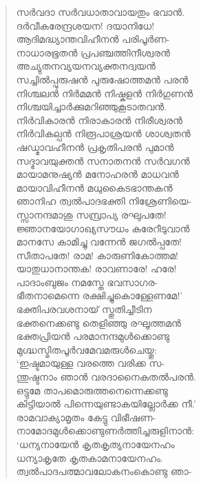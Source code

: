 \begin{verse}
സര്‍വദാ സര്‍വധാതാവായതും ഭവാന്‍.\\
ദര്‍വീകരേന്ദ്രശയന! ദയാനിധേ!\\
ആദിമദ്ധ്യാന്തവിഹീനന്‍ പരിപൂര്‍ണ-\\
നാധാരഭൂതന്‍ പ്രപഞ്ചത്തിനീശ്വരന്‍\\
അച്യുതനവ്യയനവ്യക്തനദ്വയന്‍\\
സച്ചില്‍പ്പുരുഷന്‍ പുരുഷോത്തമന്‍ പരന്‍\\
നിശ്ചലന്‍ നിര്‍മമന്‍ നിഷ്കളന്‍ നിര്‍ഗുണന്‍\\
നിശ്ചയിച്ചാര്‍ക്കുമറിഞ്ഞുകൂടാതവന്‍.\\
നിര്‍വികാരന്‍ നിരാകാരന്‍ നിരീശ്വരന്‍\\
നിര്‍വികല്പന്‍ നിരൂപാശ്രയന്‍ ശാശ്വതന്‍\\
ഷഡ്ഭാവഹീനന്‍ പ്രകൃതിപരന്‍ പുമാന്‍\\
സദ്ഭാവയുക്തന്‍ സനാതനന്‍ സര്‍വഗന്‍\\
മായാമനുഷ്യന്‍ മനോഹരന്‍ മാധവന്‍\\
മായാവിഹീനന്‍ മധുകൈടഭാന്തകന്‍\\
ഞാനിഹ ത്വല്‍പാദഭക്തി നിശ്രേണിയെ-\\
സ്സാനന്ദമാശു സമ്പ്രാപ്യ രഘുപതേ!\\
ജ്ഞാനയോഗാഖ്യസൗധം കരേറീടുവാന്‍\\
മാനസേ കാമിച്ചു വന്നേന്‍ ജഗല്‍പ്പതേ!\\
സീതാപതേ! രാമ! കാരുണികോത്തമ!\\
യാതുധാനാന്തക! രാവണാരേ! ഹരേ!\\
പാദാംബുജം നമസ്തേ ഭവസാഗര-\\
ഭീതനാമെന്നെ രക്ഷിച്ചുകൊള്ളേണമേ!’\\
ഭക്തിപരവശനായ് സ്തുതിച്ചീടിന\\
ഭക്തനെക്കണ്ടു തെളിഞ്ഞു രഘൂത്തമന്‍\\
ഭക്തപ്രിയന്‍ പരമാനന്ദമുള്‍ക്കൊണ്ടു\\
മുഗ്ദ്ധസ്മിതപൂര്‍വമേവമരുള്‍ചെയ്തു:\\
‘ഇഷ്ടമായുള്ള വരത്തെ വരിക്ക സ-\\
ന്തുഷ്ടനാം ഞാന്‍ വരദാനൈകതല്‍പരന്‍.\\
ഒട്ടുമേ താപമൊരുത്തനെന്നെക്കണ്ടു\\
കിട്ടിയാല്‍ പിന്നെയുണ്ടാകയില്ലോര്‍ക്ക നീ.’\\
രാമവാക്യാമൃതം കേട്ടു വിഭീഷണ-\\
നാമോദമുള്‍ക്കൊണ്ടുണര്‍ത്തിച്ചരുളിനാന്‍:\\
‘ധന്യനായേന്‍ കൃതകൃത്യനായേനഹം\\
ധന്യാകൃതേ കൃതകാമനായേനഹം.\\
ത്വല്‍പാദപത്മാവലോകനംകൊണ്ടു ഞാ-\\

\end{verse}
